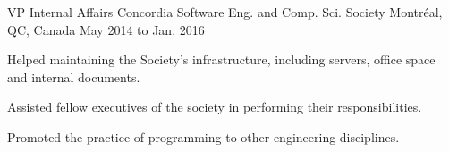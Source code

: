 \begin{cventries}
  \cventry
    {VP Internal Affairs} %
    {Concordia Software Eng. and Comp. Sci. Society} %
    {Montréal, QC, Canada} %
    {May 2014 to Jan. 2016} %
    {
      \begin{cvitems} %
        \item {Helped maintaining the Society’s infrastructure, including servers, office space and internal documents.}
        \item {Assisted fellow executives of the society in performing their responsibilities.}
        \item {Promoted the practice of programming to other engineering disciplines.}
      \end{cvitems}
    }
    \vspace{2.0mm}
    

\end{cventries}
